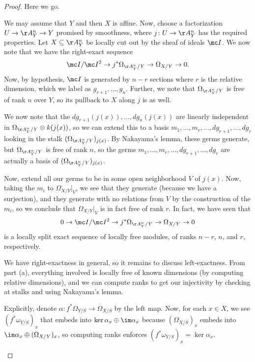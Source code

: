 \documentclass[../notes.tex]{subfiles}
\begin{document}
\begin{proof}
	Here we go.
	\begin{listalph}
		\item We may assume that $Y$ and then $X$ is affine. Now, choose a factorization $U\to\AA^n_Y\to Y$ promised by smoothness, where $j\colon U\to\AA^n_Y$ has the required properties. Let $X\subseteq\AA^n_Y$ be locally cut out by the sheaf of ideals $\mc I$. We now note that we have the right-exact sequence
		\[\mc I/\mc I^2\to j^*\Omega_{\AA^n_Y/Y}\to\Omega_{X/Y}\to 0.\]
		Now, by hypothesis, $\mc I$ is generated by $n-r$ sections where $r$ is the relative dimension, which we label as $g_{r+1},\ldots,g_n$. Further, we note that $\Omega_{\AA^n_Y/Y}$ is free of rank $n$ over $Y$, so its pullback to $X$ along $j$ is as well.

		We now note that the $dg_{r+1}(j(x)),\ldots,dg_n(j(x))$ are linearly independent in $\Omega_{\AA^n_Y/Y}\otimes k(j(x))$, so we can extend this to a basis $m_1,\ldots,m_r,\ldots,dg_{r+1},\ldots,dg_r$ looking in the stalk $(\Omega_{\AA^n_Y/Y})_{j(x)}$. By Nakayama's lemma, these germs generate, but $\Omega_{\AA^n_Y/Y}$ is free of rank $n$, so the germs $m_1,\ldots,m_r,\ldots,dg_{r+1},\ldots,dg_r$ are actually a basis of $(\Omega_{\AA^n_Y/Y})_{j(x)}$.

		Now, extend all our germs to be in some open neighborhood $V$ of $j(x)$. Now, taking the $m_i$ to $\Omega_{X/Y}|_V$, we see that they generate (because we have a surjection), and they generate with no relations from $V$ by the construction of the $m_i$, so we conclude that $\Omega_{X/Y}|_V$ is in fact free of rank $r$. In fact, we have seen that
		\[0\to\mc I/\mc I^2\to j^*\Omega_{\AA^n_Y/Y}\to\Omega_{X/Y}\to0\]
		is a locally split exact sequence of locally free modules, of ranks $n-r$, $n$, and $r$, respectively.

		\item We have right-exactness in general, so it remains to discuss left-exactness. From part (a), everything involved is locally free of known dimensions (by computing relative dimensions), and we can compute ranks to get our injectivity by checking at stalks and using Nakayama's lemma.

		Explicitly, denote $\alpha\colon f^*\Omega_{Y/S}\to\Omega_{X/S}$ by the left map. Now, for each $x\in X$, we see $\left(f^*\omega_{Y/S}\right)_x$ that embeds into $\ker\alpha_x\oplus\im\alpha_x$ because $(\Omega_{X/S})_x$ embeds into $\im\alpha_x\oplus(\Omega_{X/Y})_x$, so computing ranks enforces $\left(f^*\omega_{Y/S}\right)_x=\ker\alpha_x$.
		\qedhere
	\end{listalph}
\end{proof}
\end{document}
